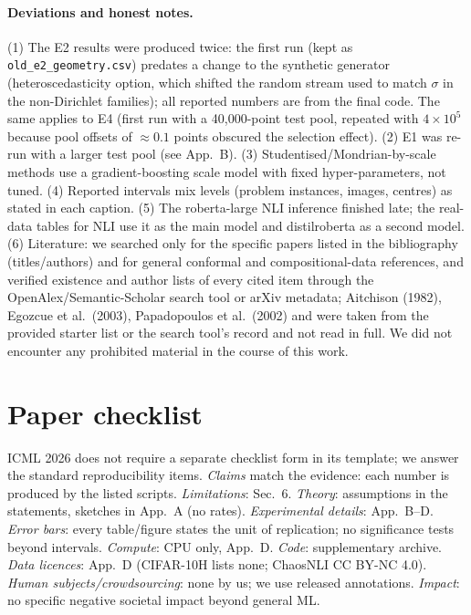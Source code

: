 \paragraph{Deviations and honest notes.} (1) The E2 results were produced twice: the first run (kept as \texttt{old\_e2\_geometry.csv}) predates a change to the synthetic generator (heteroscedasticity option, which shifted the random stream used to match $\sigma$ in the non-Dirichlet families); all reported numbers are from the final code. The same applies to E4 (first run with a 40{,}000-point test pool, repeated with $4\times10^5$ because pool offsets of $\approx0.1$ points obscured the selection effect). (2) E1 was re-run with a larger test pool (see App.\ B). (3) Studentised/Mondrian-by-scale methods use a gradient-boosting scale model with fixed hyper-parameters, not tuned. (4) Reported intervals mix levels (problem instances, images, centres) as stated in each caption. (5) The roberta-large NLI inference finished late; the real-data tables for NLI use it as the main model and distilroberta as a second model. (6) Literature: we searched only for the specific papers listed in the bibliography (titles/authors) and for general conformal and compositional-data references, and verified existence and author lists of every cited item through the OpenAlex/Semantic-Scholar search tool or arXiv metadata; Aitchison (1982), Egozcue et al.\ (2003), Papadopoulos et al.\ (2002) and \citet{vovk2005} were taken from the provided starter list or the search tool's record and not read in full. We did not encounter any prohibited material in the course of this work.

\section{Paper checklist}
ICML 2026 does not require a separate checklist form in its template; we answer the standard reproducibility items. \emph{Claims} match the evidence: each number is produced by the listed scripts. \emph{Limitations}: Sec.~6. \emph{Theory}: assumptions in the statements, sketches in App.~A (no rates). \emph{Experimental details}: App.~B--D. \emph{Error bars}: every table/figure states the unit of replication; no significance tests beyond intervals. \emph{Compute}: CPU only, App.~D. \emph{Code}: supplementary archive. \emph{Data licences}: App.~D (CIFAR-10H lists none; ChaosNLI CC BY-NC 4.0). \emph{Human subjects/crowdsourcing}: none by us; we use released annotations. \emph{Impact}: no specific negative societal impact beyond general ML.
